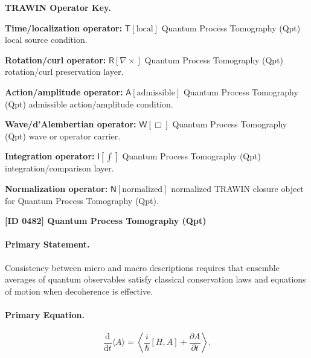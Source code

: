 \par\vspace{0.45\baselineskip}
\noindent\begin{minipage}[t]{\linewidth}
\begingroup
\small
\raggedright
\textbf{TRAWIN Operator Key.}\par
\noindent\textbf{Time/localization operator:} $\mathsf{T}\!\left[\mathrm{local}\right]$ Quantum Process Tomography (Qpt) local source condition.\par
\noindent\textbf{Rotation/curl operator:} $\mathsf{R}\!\left[\nabla\times\right]$ Quantum Process Tomography (Qpt) rotation/curl preservation layer.\par
\noindent\textbf{Action/amplitude operator:} $\mathsf{A}\!\left[\mathrm{admissible}\right]$ Quantum Process Tomography (Qpt) admissible action/amplitude condition.\par
\noindent\textbf{Wave/d'Alembertian operator:} $\mathsf{W}\!\left[\Box\right]$ Quantum Process Tomography (Qpt) wave or operator carrier.\par
\noindent\textbf{Integration operator:} $\mathsf{I}\!\left[\int\right]$ Quantum Process Tomography (Qpt) integration/comparison layer.\par
\noindent\textbf{Normalization operator:} $\mathsf{N}\!\left[\mathrm{normalized}\right]$ normalized TRAWIN closure object for Quantum Process Tomography (Qpt).\par
\endgroup
\end{minipage}

\clearpage
\noindent\textbf{[ID 0482] Quantum Process Tomography (Qpt)}\par
\vspace{0.35em}
\paragraph{Primary Statement.}
Consistency between micro and macro descriptions requires that ensemble averages of quantum observables satisfy classical conservation laws and equations of motion when decoherence is effective.

\paragraph{Primary Equation.}
\begin{equation}
\frac{\mathrm{d}}{\mathrm{d}t}\langle A\rangle
=
\left\langle
\frac{i}{\hbar}[H,A]
+
\frac{\partial A}{\partial t}
\right\rangle .
\end{equation}

